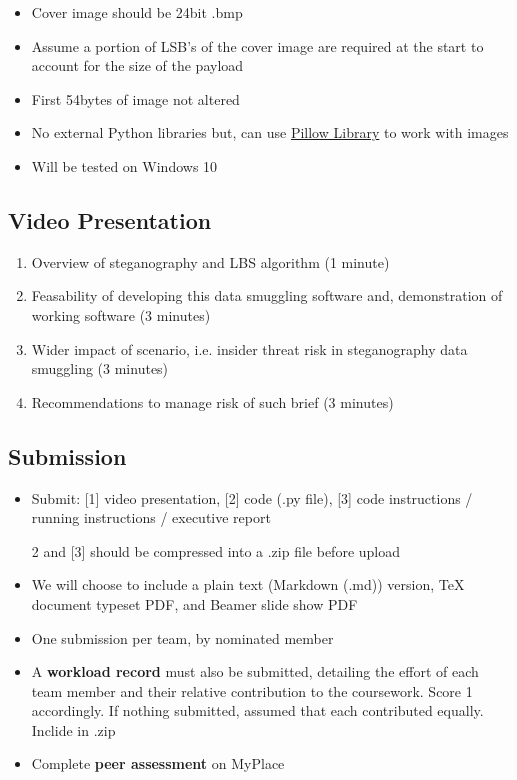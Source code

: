 \documentclass[11pt, english]{article}
\begin{document}
	\begin{itemize}
	\setlength\itemsep{0cm}
		\item Cover image should be 24bit .bmp
		\item Assume a portion of LSB's of the cover image are required at the start to account for the size of the payload
		\item First 54bytes of image not altered
		\item No external Python libraries but, can use \href{https://pillow.readthedocs.io/en/latest/installation.html}{Pillow Library} to work with images
		\item Will be tested on Windows 10
	\end{itemize}

	\subsection*{Video Presentation}

	\begin{enumerate}
	\setlength\itemsep{0cm}
		\item Overview of steganography and LBS algorithm (1 minute)
		\item Feasability of developing this data smuggling software and, demonstration of working software (3 minutes)
		\item Wider impact of scenario, i.e. insider threat risk in steganography data smuggling (3 minutes)
		\item Recommendations to manage risk of such brief (3 minutes)
	\end{enumerate}

	\subsection*{Submission}

	\begin{itemize}
	\setlength\itemsep{0cm}
		\item Submit: [1] video presentation, [2] code (.py file), [3] code instructions / running instructions / executive report
		\item [2] and [3] should be compressed into a .zip file before upload
		\item We will choose to include a plain text (Markdown (.md)) version, TeX document typeset PDF, and Beamer slide show PDF
		\item One submission per team, by nominated member
		\item A \textbf{workload record} must also be submitted, detailing the effort of each team member and their relative contribution to the coursework. Score 1 accordingly. If nothing submitted, assumed that each contributed equally. Inclide in .zip
		\item Complete \textbf{peer assessment} on MyPlace
	\end{itemize}
\end{document}
